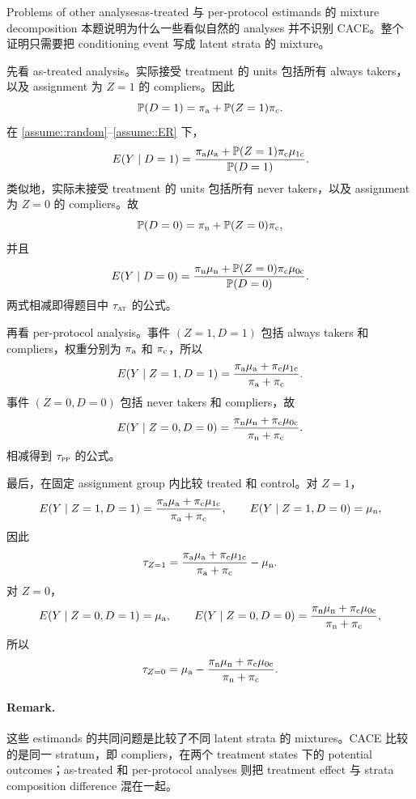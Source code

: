 \begin{exercisesolution}{Problems of other analyses}{as-treated 与 per-protocol estimands 的 mixture decomposition}
本题说明为什么一些看似自然的 analyses 并不识别 CACE。整个证明只需要把 conditioning event 写成 latent strata 的 mixture。

先看 as-treated analysis。实际接受 treatment 的 units 包括所有 always takers，以及 assignment 为 $Z=1$ 的 compliers。因此
\[
\mathbb{P}(D=1)=\pi_{\textup{a}}+\mathbb{P}(Z=1)\pi_{\textup{c}}.
\]
在 \cref{assume::random}--\cref{assume::ER} 下，
\[
E(Y\mid D=1)
=
\frac{\pi_{\textup{a}}\mu_{\textup{a}}+\mathbb{P}(Z=1)\pi_{\textup{c}}\mu_{1\textup{c}}}
     {\mathbb{P}(D=1)}.
\]
类似地，实际未接受 treatment 的 units 包括所有 never takers，以及 assignment 为 $Z=0$ 的 compliers。故
\[
\mathbb{P}(D=0)=\pi_{\textup{n}}+\mathbb{P}(Z=0)\pi_{\textup{c}},
\]
并且
\[
E(Y\mid D=0)
=
\frac{\pi_{\textup{n}}\mu_{\textup{n}}+\mathbb{P}(Z=0)\pi_{\textup{c}}\mu_{0\textup{c}}}
     {\mathbb{P}(D=0)}.
\]
两式相减即得题目中 $\tau_\textsc{at}$ 的公式。

再看 per-protocol analysis。事件 $(Z=1,D=1)$ 包括 always takers 和 compliers，权重分别为 $\pi_{\textup{a}}$ 和 $\pi_{\textup{c}}$，所以
\[
E(Y\mid Z=1,D=1)
=
\frac{\pi_{\textup{a}}\mu_{\textup{a}}+\pi_{\textup{c}}\mu_{1\textup{c}}}
     {\pi_{\textup{a}}+\pi_{\textup{c}}}.
\]
事件 $(Z=0,D=0)$ 包括 never takers 和 compliers，故
\[
E(Y\mid Z=0,D=0)
=
\frac{\pi_{\textup{n}}\mu_{\textup{n}}+\pi_{\textup{c}}\mu_{0\textup{c}}}
     {\pi_{\textup{n}}+\pi_{\textup{c}}}.
\]
相减得到 $\tau_\textsc{pp}$ 的公式。

最后，在固定 assignment group 内比较 treated 和 control。对 $Z=1$，
\[
E(Y\mid Z=1,D=1)
=
\frac{\pi_{\textup{a}}\mu_{\textup{a}}+\pi_{\textup{c}}\mu_{1\textup{c}}}
     {\pi_{\textup{a}}+\pi_{\textup{c}}},
\qquad
E(Y\mid Z=1,D=0)=\mu_{\textup{n}},
\]
因此
\[
\tau_{Z=1}
=
\frac{\pi_{\textup{a}}\mu_{\textup{a}}+\pi_{\textup{c}}\mu_{1\textup{c}}}
     {\pi_{\textup{a}}+\pi_{\textup{c}}}
-\mu_{\textup{n}}.
\]
对 $Z=0$，
\[
E(Y\mid Z=0,D=1)=\mu_{\textup{a}},
\qquad
E(Y\mid Z=0,D=0)
=
\frac{\pi_{\textup{n}}\mu_{\textup{n}}+\pi_{\textup{c}}\mu_{0\textup{c}}}
     {\pi_{\textup{n}}+\pi_{\textup{c}}},
\]
所以
\[
\tau_{Z=0}
=
\mu_{\textup{a}}
-
\frac{\pi_{\textup{n}}\mu_{\textup{n}}+\pi_{\textup{c}}\mu_{0\textup{c}}}
     {\pi_{\textup{n}}+\pi_{\textup{c}}}.
\]

\paragraph{Remark.}
这些 estimands 的共同问题是比较了不同 latent strata 的 mixtures。CACE 比较的是同一 stratum，即 compliers，在两个 treatment states 下的 potential outcomes；as-treated 和 per-protocol analyses 则把 treatment effect 与 strata composition difference 混在一起。
\end{exercisesolution}

